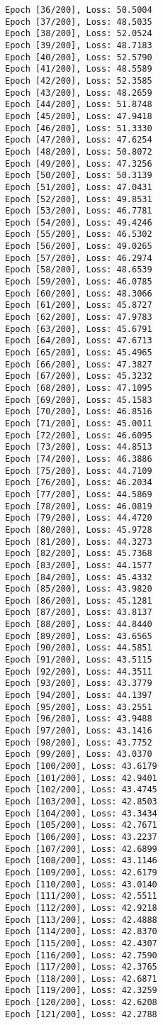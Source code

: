 \documentclass[11pt]{article}
\begin{document}
\begin{Verbatim}[commandchars=\\\{\}]
Epoch [36/200], Loss: 50.5004
Epoch [37/200], Loss: 48.5035
Epoch [38/200], Loss: 52.0524
Epoch [39/200], Loss: 48.7183
Epoch [40/200], Loss: 52.5790
Epoch [41/200], Loss: 48.5589
Epoch [42/200], Loss: 52.3585
Epoch [43/200], Loss: 48.2659
Epoch [44/200], Loss: 51.8748
Epoch [45/200], Loss: 47.9418
Epoch [46/200], Loss: 51.3330
Epoch [47/200], Loss: 47.6254
Epoch [48/200], Loss: 50.8072
Epoch [49/200], Loss: 47.3256
Epoch [50/200], Loss: 50.3139
Epoch [51/200], Loss: 47.0431
Epoch [52/200], Loss: 49.8531
Epoch [53/200], Loss: 46.7781
Epoch [54/200], Loss: 49.4246
Epoch [55/200], Loss: 46.5302
Epoch [56/200], Loss: 49.0265
Epoch [57/200], Loss: 46.2974
Epoch [58/200], Loss: 48.6539
Epoch [59/200], Loss: 46.0785
Epoch [60/200], Loss: 48.3066
Epoch [61/200], Loss: 45.8727
Epoch [62/200], Loss: 47.9783
Epoch [63/200], Loss: 45.6791
Epoch [64/200], Loss: 47.6713
Epoch [65/200], Loss: 45.4965
Epoch [66/200], Loss: 47.3827
Epoch [67/200], Loss: 45.3232
Epoch [68/200], Loss: 47.1095
Epoch [69/200], Loss: 45.1583
Epoch [70/200], Loss: 46.8516
Epoch [71/200], Loss: 45.0011
Epoch [72/200], Loss: 46.6095
Epoch [73/200], Loss: 44.8513
Epoch [74/200], Loss: 46.3886
Epoch [75/200], Loss: 44.7109
Epoch [76/200], Loss: 46.2034
Epoch [77/200], Loss: 44.5869
Epoch [78/200], Loss: 46.0819
Epoch [79/200], Loss: 44.4720
Epoch [80/200], Loss: 45.9728
Epoch [81/200], Loss: 44.3273
Epoch [82/200], Loss: 45.7368
Epoch [83/200], Loss: 44.1577
Epoch [84/200], Loss: 45.4332
Epoch [85/200], Loss: 43.9820
Epoch [86/200], Loss: 45.1281
Epoch [87/200], Loss: 43.8137
Epoch [88/200], Loss: 44.8440
Epoch [89/200], Loss: 43.6565
Epoch [90/200], Loss: 44.5851
Epoch [91/200], Loss: 43.5115
Epoch [92/200], Loss: 44.3511
Epoch [93/200], Loss: 43.3779
Epoch [94/200], Loss: 44.1397
Epoch [95/200], Loss: 43.2551
Epoch [96/200], Loss: 43.9488
Epoch [97/200], Loss: 43.1416
Epoch [98/200], Loss: 43.7752
Epoch [99/200], Loss: 43.0370
Epoch [100/200], Loss: 43.6179
Epoch [101/200], Loss: 42.9401
Epoch [102/200], Loss: 43.4745
Epoch [103/200], Loss: 42.8503
Epoch [104/200], Loss: 43.3434
Epoch [105/200], Loss: 42.7671
Epoch [106/200], Loss: 43.2237
Epoch [107/200], Loss: 42.6899
Epoch [108/200], Loss: 43.1146
Epoch [109/200], Loss: 42.6179
Epoch [110/200], Loss: 43.0140
Epoch [111/200], Loss: 42.5511
Epoch [112/200], Loss: 42.9218
Epoch [113/200], Loss: 42.4888
Epoch [114/200], Loss: 42.8370
Epoch [115/200], Loss: 42.4307
Epoch [116/200], Loss: 42.7590
Epoch [117/200], Loss: 42.3765
Epoch [118/200], Loss: 42.6871
Epoch [119/200], Loss: 42.3259
Epoch [120/200], Loss: 42.6208
Epoch [121/200], Loss: 42.2788

\end{Verbatim}
\end{document}
